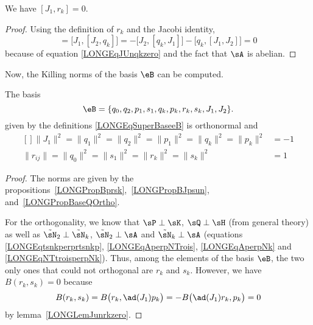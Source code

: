 \begin{lemma}		\label{LONGLemJunrkzero}
	We have $[J_1,r_k]=0$.
\end{lemma}

\begin{proof}
	Using the definition of $r_k$ and the Jacobi identity,
	\begin{equation}
		[J_1,r_k]= \big[ J_1,[J_2,q_k] \big]=-\big[ J_2,[q_k,J_1] \big]-\big[ q_k,[J_1,J_2] \big]=0
	\end{equation}
	because of equation \eqref{LONGEqJUnqkzero} and the fact that $\sA$ is abelian.
\end{proof}

Now, the Killing norms of the basis $\eB$ can be computed.
\begin{theorem}		\label{LONGThoBaisXXorthoigher}
	The basis
	\begin{equation}		\label{EQooSDGEooUuVpXy}
		\eB=\{ q_0,q_2,p_1,s_1,q_k,p_k,r_k,s_k,J_1,J_2 \}.
	\end{equation}
	given by the definitions \eqref{LONGEqSuperBaseeB}  is orthonormal and
	\begin{equation}
		\begin{aligned}[]
			\| J_1 \|^2=\| q_1 \|^2=\| q_2 \|^2=\| p_1 \|^2=\| q_k \|^2=\| p_k \|^2 & =-1 \\
			\| r_{ij} \|=\| q_0 \|^2=\| s_1 \|^2=\| r_k \|^2=\| s_k \|^2            & =1
		\end{aligned}
	\end{equation}
\end{theorem}

\begin{proof}
	The norms are given by the propositions~\ref{LONGPropBprsk},~\ref{LONGPropBJpsun}, and~\ref{LONGPropBaseQOrtho}.

	For the orthogonality, we know that $\sP\perp\sK$, $\sQ\perp\sH$ (from general theory) as well as $\tilde\sN_2\perp\tilde\sN_k$, $\tilde\sN_2\perp\sA$ and $\tilde\sN_k\perp\sA$ (equations \eqref{LONGEqtsnkperprtsnkp}, \eqref{LONGEqAperpNTrois}, \eqref{LONGEqAperpNk} and \eqref{LONGEqNTtroisperpNk}). Thus, among the elements of the basis $\eB$, the two only ones that could not orthogonal are $r_k$ and $s_k$. However, we have $B(r_k,s_k)=0$ because
	\begin{equation}
		B(r_k,s_k)=B\big( r_k,\ad(J_1)p_k \big)=-B\big( \ad(J_1)r_k,p_k \big)=0
	\end{equation}
	by lemma~\ref{LONGLemJunrkzero}.

\end{proof}


